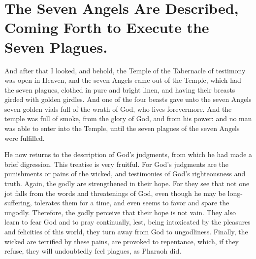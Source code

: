 \chapter[Sermon 68. The Seven Angels Are Described, Coming Forth to Execute the Seven Plagues.]{The Seven Angels Are Described, Coming Forth to Execute the Seven Plagues.}
\label{sermon:068}

And after that I looked, and behold, the Temple of the Tabernacle of testimony was open in Heaven, and the seven Angels came out of the Temple, which had the seven plagues, clothed in pure and bright linen, and having their breasts girded with golden girdles. And one of the four beasts gave unto the seven Angels seven golden vials full of the wrath of God, who lives forevermore. And the temple was full of smoke, from the glory of God, and from his power: and no man was able to enter into the Temple, until the seven plagues of the seven Angels were fulfilled.

He now returns to the description of God’s judgments, from which he had made a brief digression. This treatise is very fruitful. For God’s judgments are the punishments or pains of the wicked, and testimonies of God’s righteousness and truth. Again, the godly are strengthened in their hope. For they see that not one jot falls from the words and threatenings of God, even though he may be long-suffering, tolerates them for a time, and even seems to favor and spare the ungodly. Therefore, the godly perceive that their hope is not vain. They also learn to fear God and to pray continually, lest, being intoxicated by the pleasures and felicities of this world, they turn away from God to ungodliness. Finally, the wicked are terrified by these pains, are provoked to repentance, which, if they refuse, they will undoubtedly feel plagues, as Pharaoh did.

